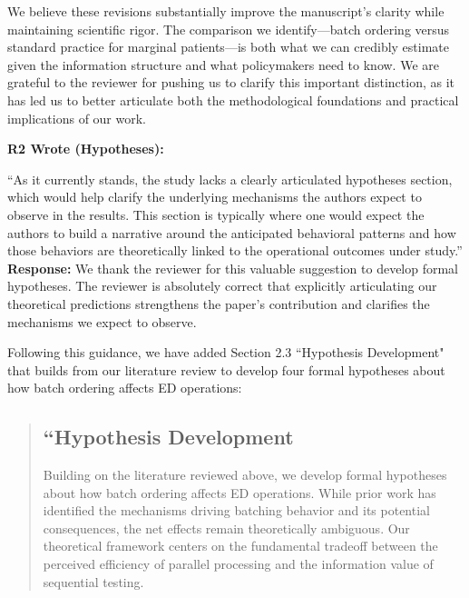 \documentclass[11pt]{article}
\newenvironment{quote2}
{ \bigskip
\noindent
         \small\em
         \baselineskip=14pt
}
\newcommand{\1}{\hbox{\rm 1\kern-.35em 1}}
\begin{document}
{We believe these revisions substantially improve the manuscript's clarity while maintaining scientific rigor. The comparison we identify—batch ordering versus standard practice for marginal patients—is both what we can credibly estimate given the information structure and what policymakers need to know. We are grateful to the reviewer for pushing us to clarify this important distinction, as it has led us to better articulate both the methodological foundations and practical implications of our work.
\color{black}

\begin{quote2}
\textbf{R2 Wrote (Hypotheses):}  

\noindent``As it currently stands, the study lacks a clearly articulated hypotheses section, which would help clarify the underlying mechanisms the authors expect to observe in the results. This section is typically where one would expect the authors to build a narrative around the anticipated behavioral patterns and how those behaviors are theoretically linked to the operational outcomes under study.” 
\end{quote2}

\noindent\textbf{Response:} \color{blue}We thank the reviewer for this valuable suggestion to develop formal hypotheses. The reviewer is absolutely correct that explicitly articulating our theoretical predictions strengthens the paper's contribution and clarifies the mechanisms we expect to observe.

Following this guidance, we have added Section 2.3 ``Hypothesis Development" that builds from our literature review to develop four formal hypotheses about how batch ordering affects ED operations:

\begin{quote}
\subsection*{``Hypothesis Development}

Building on the literature reviewed above, we develop formal hypotheses about how batch ordering affects ED operations. While prior work has identified the mechanisms driving batching behavior and its potential consequences, the net effects remain theoretically ambiguous. Our theoretical framework centers on the fundamental tradeoff between the perceived efficiency of parallel processing and the information value of sequential testing.


\end{quote}}
\end{document}
